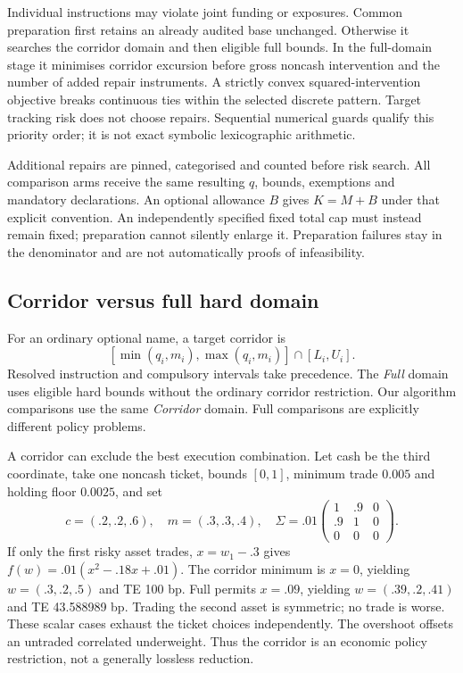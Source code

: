 \documentclass[preprint,12pt,authoryear]{elsarticle}
\begin{document}
Individual instructions may violate joint funding or exposures. Common
preparation first retains an already audited base unchanged. Otherwise it searches
the corridor domain and then eligible full bounds. In the full-domain stage it
minimises corridor excursion before gross noncash intervention and the number
of added repair instruments. A strictly convex squared-intervention objective
breaks continuous ties within the selected discrete pattern. Target tracking
risk does not choose repairs. Sequential numerical guards qualify this priority
order; it is not exact symbolic lexicographic arithmetic.

Additional repairs are pinned, categorised and counted before risk search.
All comparison arms receive the same resulting $q$, bounds, exemptions and
mandatory declarations. An optional allowance $B$ gives $K=M+B$ under that
explicit convention. An independently specified fixed total cap must instead
remain fixed; preparation cannot silently enlarge it. Preparation failures stay
in the denominator and are not automatically proofs of infeasibility.

\subsection{Corridor versus full hard domain}
For an ordinary optional name, a target corridor is
\[
 [\min(q_i,m_i),\max(q_i,m_i)]\cap[L_i,U_i].
\]
Resolved instruction and compulsory intervals take precedence. The \emph{Full}
domain uses eligible hard bounds without the ordinary corridor restriction.
Our algorithm comparisons use the same \emph{Corridor} domain. Full comparisons
are explicitly different policy problems.

A corridor can exclude the best execution combination. Let cash be the third
coordinate, take one noncash ticket, bounds $[0,1]$, minimum trade $0.005$ and
holding floor $0.0025$, and set
\[
 c=(.2,.2,.6),\quad m=(.3,.3,.4),\quad
 \Sigma=.01\begin{pmatrix}1&.9&0\\.9&1&0\\0&0&0\end{pmatrix}.
\]
If only the first risky asset trades, $x=w_1-.3$ gives
$f(w)=.01(x^2-.18x+.01)$. The corridor minimum is $x=0$, yielding
$w=(.3,.2,.5)$ and TE 100 bp. Full permits $x=.09$, yielding
$w=(.39,.2,.41)$ and TE 43.588989 bp. Trading the second asset is symmetric;
no trade is worse. These scalar cases exhaust the ticket choices independently.
The overshoot offsets an untraded correlated underweight. Thus the corridor is
an economic policy restriction, not a generally lossless reduction.
\end{document}
